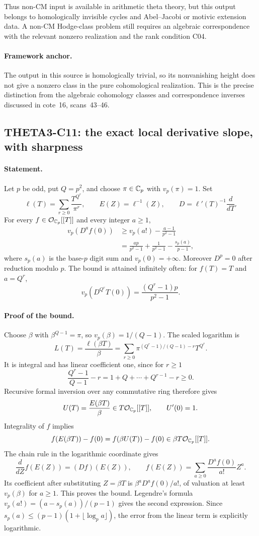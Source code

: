 Thus non-CM input is available in arithmetic theta theory, but this
output belongs to homologically invisible cycles and
Abel--Jacobi or motivic extension data. A non-CM Hodge-class problem
still requires an algebraic correspondence with the relevant
nonzero realization and the rank condition C04.

\paragraph{Framework anchor.}
The output in this source is homologically trivial, so its nonvanishing
height does not give a nonzero class in the pure cohomological realization.
This is the precise distinction from the algebraic cohomology classes
and correspondence inverses discussed in cote~16, scans~43--46.

\subsection{THETA3-C11: the exact local derivative slope, with sharpness}\label{C11}

\paragraph{Statement.}
Let $p$ be odd, put $Q=p^2$, and choose $\pi\in\mathbb C_p$ with
$v_p(\pi)=1$. Set
\[
 \ell(T)=\sum_{r\geq0}\frac{T^{Q^r}}{\pi^r},\qquad
 E(Z)=\ell^{-1}(Z),\qquad D=\ell'(T)^{-1}\frac{d}{dT}.
\]
For every $f\in\mathcal O_{\mathbb C_p}[[T]]$ and every integer $a\geq1$,
\begin{align*}
 v_p(D^af(0))
 &\geq v_p(a!)-\frac{a-1}{p^2-1}\\
 &=\frac{ap}{p^2-1}+\frac1{p^2-1}
                     -\frac{s_p(a)}{p-1},
\end{align*}
where $s_p(a)$ is the base-$p$ digit sum and $v_p(0)=+\infty$.
Moreover $D^p=0$ after reduction modulo $p$.
The bound is attained infinitely often: for $f(T)=T$ and $a=Q^r$,
\[
 v_p(D^{Q^r}T(0))=\frac{(Q^r-1)p}{p^2-1}.
\]

\paragraph{Proof of the bound.}
Choose $\beta$ with $\beta^{Q-1}=\pi$, so
$v_p(\beta)=1/(Q-1)$. The scaled logarithm is
\[
 L(T)=\frac{\ell(\beta T)}\beta
 =\sum_{r\geq0}
     \pi^{(Q^r-1)/(Q-1)-r}T^{Q^r}.
\]
It is integral and has linear coefficient one, since for $r\geq1$
\[
 \frac{Q^r-1}{Q-1}-r=1+Q+\cdots+Q^{r-1}-r\geq0.
\]
Recursive formal inversion over any commutative ring therefore gives
\[
 U(T)=\frac{E(\beta T)}\beta
       \in T\mathcal O_{\mathbb C_p}[[T]],\qquad U'(0)=1.
\]
Integrality of $f$ implies
\[
 f(E(\beta T))-f(0)=f(\beta U(T))-f(0)
                         \in\beta T\mathcal O_{\mathbb C_p}[[T]].
\]
The chain rule in the logarithmic coordinate gives
\[
 \frac{d}{dZ}f(E(Z))=(Df)(E(Z)),\qquad
 f(E(Z))=\sum_{a\geq0}\frac{D^af(0)}{a!}Z^a.
\]
Its coefficient after substituting $Z=\beta T$ is
$\beta^aD^af(0)/a!$, of valuation at least $v_p(\beta)$ for
$a\geq1$. This proves the bound. Legendre's formula
$v_p(a!)=(a-s_p(a))/(p-1)$ gives the second expression. Since
$s_p(a)\leq(p-1)(1+\lfloor\log_pa\rfloor)$, the error from the
linear term is explicitly logarithmic.


